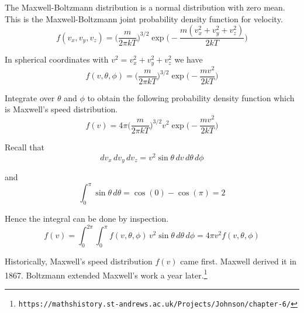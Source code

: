 \documentclass[12pt]{article}
\begin{document}
The Maxwell-Boltzmann distribution is a normal distribution with zero mean.
This is the Maxwell-Boltzmann joint probability density function for velocity.
\begin{equation*}
f(v_x,v_y,v_z)=
\bigg(\frac{m}{2\pi kT}\bigg)^{3/2}
\exp\bigg({-}\frac{m(v_x^2+v_y^2+v_z^2)}{2kT}\bigg)
\end{equation*}

In spherical coordinates with $v^2=v_x^2+v_y^2+v_z^2$ we have
\begin{equation*}
f(v,\theta,\phi)=
\bigg(\frac{m}{2\pi kT}\bigg)^{3/2}
\exp\bigg({-}\frac{mv^2}{2kT}\bigg)
\end{equation*}

Integrate over $\theta$ and $\phi$
to obtain the following probability density function
which is Maxwell's speed distribution.
\begin{equation*}
f(v)=4\pi\bigg(\frac{m}{2\pi kT}\bigg)^{3/2}
v^2\exp\bigg({-}\frac{mv^2}{2kT}\bigg)
\end{equation*}

Recall that
\begin{equation*}
dv_x\,dv_y\,dv_z=v^2\sin\theta\,dv\,d\theta\,d\phi
\end{equation*}

and
\begin{equation*}
\int_0^\pi\sin\theta\,d\theta=\cos(0)-\cos(\pi)=2
\end{equation*}

Hence the integral can be done by inspection.
\begin{equation*}
f(v)=\int_0^{2\pi}\int_0^\pi f(v,\theta,\phi)\,v^2\sin\theta\,d\theta\,d\phi
=4\pi v^2f(v,\theta,\phi)
\end{equation*}

Historically, Maxwell's speed distribution $f(v)$ came first.
Maxwell derived it in 1867.
Boltzmann extended Maxwell's work a year later.\footnote{
\tt https://mathshistory.st-andrews.ac.uk/Projects/Johnson/chapter-6/}
\end{document}

